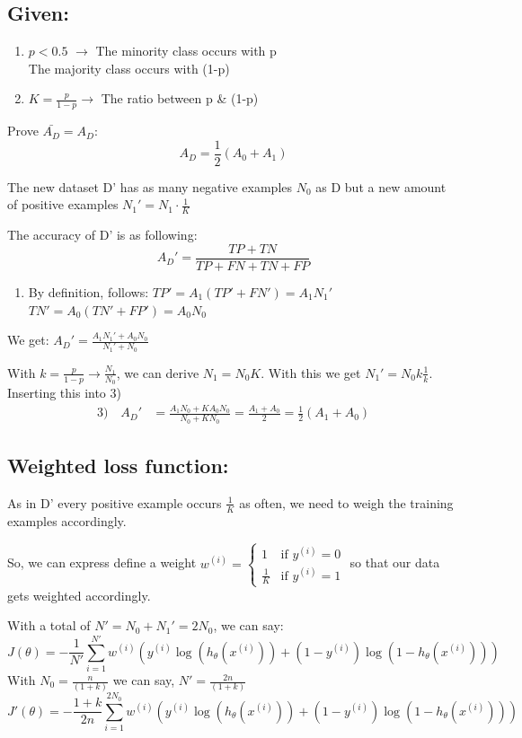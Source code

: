 \begin{answer}
    \subsection*{Given:}
\begin{enumerate}
    \item $p < 0.5$ $\rightarrow$ The minority class occurs with p \\
    The majority class occurs with (1-p)
    
    \item $K = \frac{p}{1-p} \rightarrow$ The ratio between p \& (1-p)
\end{enumerate}

Prove $\bar{A_D} = A_D$:
\[ A_D = \frac{1}{2}(A_0 + A_1) \]

The new dataset D' has as many negative examples $N_0$ as D but a new amount of positive examples $N_1' = N_1 \cdot \frac{1}{K}$

The accuracy of D' is as following:
\[ A_D' = \frac{TP+TN}{TP+FN+TN+FP} \]

\begin{enumerate}
    \item By definition, follows: $TP' = A_1(TP'+FN') = A_1 N_1'$ \\
    $TN' = A_0(TN'+FP') = A_0 N_0$
\end{enumerate}

We get: $A_D' = \frac{A_1 N_1' + A_0 N_0}{N_1' + N_0}$

With $k = \frac{p}{1-p} \rightarrow \frac{N_1}{N_0}$, we can derive $N_1=N_0 K$. With this we get $N_1' = N_0 k \frac{1}{k}$. \\

Inserting this into 3)
\begin{align*}
    3) \quad A_D' &= \frac{A_1 N_0 + K A_0 N_0}{N_0 + K N_0} = \frac{A_1+A_0}{2} = \frac{1}{2}(A_1+A_0)
\end{align*}

\subsection*{Weighted loss function:}
As in D' every positive example occurs $\frac{1}{K}$ as often, we need to weigh the training examples accordingly. 

So, we can express define a weight $w^{(i)} = \begin{cases} 1 & \text{if } y^{(i)}=0 \\ \frac{1}{K} & \text{if } y^{(i)}=1 \end{cases}$ so that our data gets weighted accordingly.

With a total of $N' = N_0 + N_1' = 2N_0$, we can say:
\[ J(\theta) = -\frac{1}{N'} \sum_{i=1}^{N'} w^{(i)} \left(y^{(i)}\log(h_{\theta}(x^{(i)}))
+  (1 - y^{(i)})\log(1 - h_{\theta}(x^{(i)}))\right) \]
With $N_0=\frac{n}{(1+k)}$ we can say, $N'=\frac{2n}{(1+k)}$
\[ J'(\theta) = -\frac{1 + k}{2n} \sum_{i=1}^{2N_0} w^{(i)} \left(y^{(i)}\log(h_{\theta}(x^{(i)}))
+  (1 - y^{(i)})\log(1 - h_{\theta}(x^{(i)}))\right)\]

\end{answer}